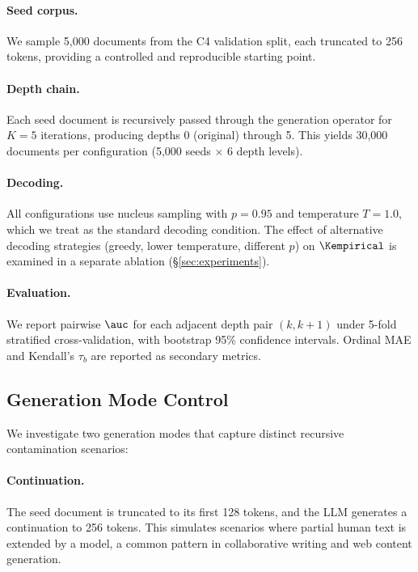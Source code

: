 \paragraph{Seed corpus.}
We sample 5{,}000 documents from the C4 validation split, each truncated to 256 tokens, providing a controlled and reproducible starting point.

\paragraph{Depth chain.}
Each seed document is recursively passed through the generation operator for $K = 5$ iterations, producing depths 0 (original) through 5.
This yields 30{,}000 documents per configuration (5{,}000 seeds $\times$ 6 depth levels).

\paragraph{Decoding.}
All configurations use nucleus sampling with $p = 0.95$ and temperature $T = 1.0$, which we treat as the standard decoding condition.
The effect of alternative decoding strategies (greedy, lower temperature, different $p$) on $\Kempirical$ is examined in a separate ablation (\S\ref{sec:experiments}).

\paragraph{Evaluation.}
We report pairwise $\auc$ for each adjacent depth pair $(k, k{+}1)$ under 5-fold stratified cross-validation, with bootstrap 95\% confidence intervals.
Ordinal MAE and Kendall's $\tau_b$ are reported as secondary metrics.

\subsection{Generation Mode Control}
\label{sec:generation_mode}

We investigate two generation modes that capture distinct recursive contamination scenarios:

\paragraph{Continuation.}
The seed document is truncated to its first 128 tokens, and the LLM generates a continuation to 256 tokens.
This simulates scenarios where partial human text is extended by a model, a common pattern in collaborative writing and web content generation.


